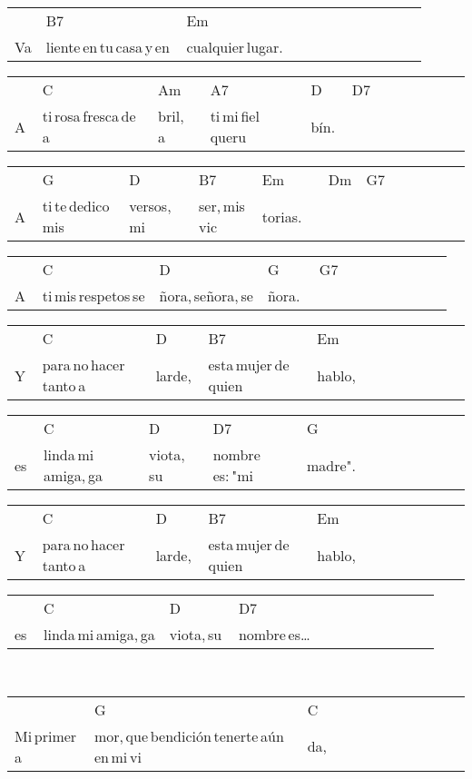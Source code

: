 \begin{multicols}{2}
\begin{minipage}{\columnwidth}
\noindent
\begin{tabular}{llllllllllll}
&B7&Em\\
Va&liente\,en\,tu\,casa\,y\,en\,&cualquier\,lugar.
\end{tabular}

\noindent
\begin{tabular}{llllllllllll}
&C&Am&A7&D&D7\\
A\,&ti\,rosa\,fresca\,de\,a&bril,\,a\,&ti\,mi\,fiel\,queru&bín.\,&
\end{tabular}

\noindent
\begin{tabular}{llllllllllll}
&G&D&B7&Em&Dm&G7\\
A\,&ti\,te\,dedico\,mis\,&versos,\,mi\,&ser,\,mis\,vic&torias.\,\,\,\,\,&\,\,\,\quad\,\,\,\,&
\end{tabular}

\noindent
\begin{tabular}{llllllllllll}
&C&D&G&G7\\
A\,&ti\,mis\,respetos\,se&ñora,\,señora,\,se&ñora.\,\,&
\end{tabular}

\noindent
\begin{tabular}{llllllllllll}
&C&D&B7&Em\\
Y\,&para\,no\,hacer\,tanto\,a&larde,\,&esta\,mujer\,de\,quien\,&hablo,
\end{tabular}

\noindent
\begin{tabular}{llllllllllll}
&C&D&D7&G\\
es\,&linda\,mi\,amiga,\,ga&viota,\,su\,&nombre\,es:\,"mi\,&madre".
\end{tabular}

\noindent
\begin{tabular}{llllllllllll}
&C&D&B7&Em\\
Y\,&para\,no\,hacer\,tanto\,a&larde,\,&esta\,mujer\,de\,quien\,&hablo,
\end{tabular}

\noindent
\begin{tabular}{llllllllllll}
&C&D&D7\\
es\,&linda\,mi\,amiga,\,ga&viota,\,su\,&nombre\,es\dots
\end{tabular}
\end{minipage}\\

\noindent
\begin{minipage}{\columnwidth}
\noindent
\noindent
\begin{tabular}{llllllllllll}
&G&C\\
Mi\,primer\,a&mor,\,que\,bendición\,tenerte\,aún\,en\,mi\,vi&da,
\end{tabular}


\end{minipage}
\end{multicols}
